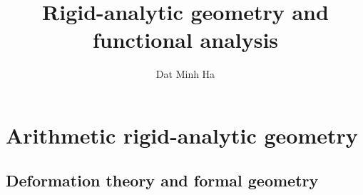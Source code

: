 

\setcounter{chapter}{-1}




    \title{Rigid-analytic geometry and functional analysis}
    
    \author{Dat Minh Ha}
    \maketitle
    
    \begin{abstract}
        
    \end{abstract}
    
    {
      \hypersetup{} 
      \dominitoc
      \tableofcontents %
    }
    
    

    \part{Arithmetic rigid-analytic geometry}
        \chapter{Deformation theory and formal geometry}
            \begin{abstract}
                
            \end{abstract}
            
            \minitoc
        
            
            
            
            
            
            
            
            
            
            
            
            
            
        
